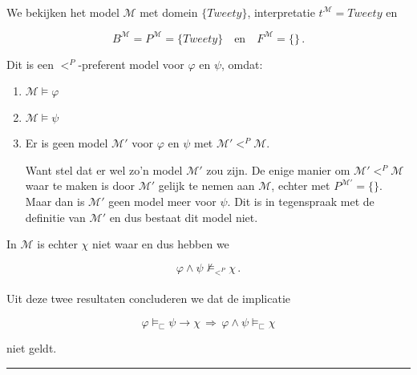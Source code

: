 \documentclass[a4paper,11pt]{article}
\begin{document}
\paragraph{}

We bekijken het model $\mathcal{M}$ met domein $\{Tweety\}$, interpretatie
$t^{\mathcal{M}} = Tweety$ en

\begin{displaymath}
B^{\mathcal{M}} = P^{\mathcal{M}} = \{Tweety\} \quad \mbox{en} \quad
F^{\mathcal{M}} = \{\} \, \mbox{.}
\end{displaymath}

Dit is een $<^{P}$-preferent model voor $\varphi$ en $\psi$, omdat:

\begin{enumerate}

\item $\mathcal{M} \vDash \varphi$
\item $\mathcal{M} \vDash \psi$
\item Er is geen model $\mathcal{M}'$ voor $\varphi$ en $\psi$ met
  $\mathcal{M}' <^{P} \mathcal{M}$.

Want stel dat er wel zo'n model $\mathcal{M}'$ zou zijn. De enige manier om
$\mathcal{M}' <^{P} \mathcal{M}$ waar te maken is door $\mathcal{M}'$ gelijk
te nemen aan $\mathcal{M}$, echter met $P^{\mathcal{M}'} = \{\}$. Maar dan is
$\mathcal{M}'$ geen model meer voor $\psi$. Dit is in tegenspraak met de
definitie van $\mathcal{M}'$ en dus bestaat dit model niet.

\end{enumerate}

In $\mathcal{M}$ is echter $\chi$ niet waar en dus hebben we

\begin{displaymath}
\varphi \wedge \psi \nvDash_{<^{P}} \chi \, \mbox{.}
\end{displaymath}

\paragraph{}

Uit deze twee resultaten concluderen we dat de implicatie

\begin{displaymath}
\varphi \vDash_{\sqsubset} \psi \rightarrow \chi
\, \Longrightarrow \,
\varphi \wedge \psi \vDash_{\sqsubset} \chi
\end{displaymath}

niet geldt.

\hfill\rule{2.1mm}{2.mm}
\end{document}
